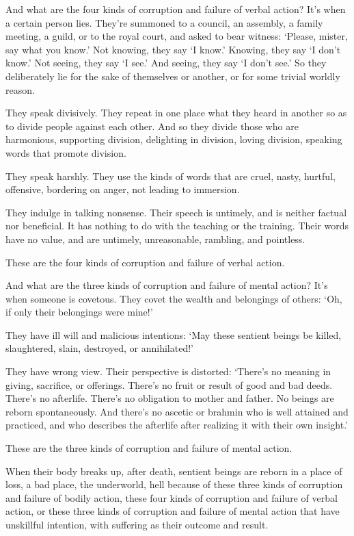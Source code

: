 \documentclass[12pt,openany]{book}%
\begin{document}
And what are the four kinds of corruption and failure of verbal action? It’s when a certain person lies. They’re summoned to a council, an assembly, a family meeting, a guild, or to the royal court, and asked to bear witness: ‘Please, mister, say what you know.’ Not knowing, they say ‘I know.’ Knowing, they say ‘I don’t know.’ Not seeing, they say ‘I see.’ And seeing, they say ‘I don’t see.’ So they deliberately lie for the sake of themselves or another, or for some trivial worldly reason. 

They speak divisively. They repeat in one place what they heard in another so as to divide people against each other. And so they divide those who are harmonious, supporting division, delighting in division, loving division, speaking words that promote division. 

They speak harshly. They use the kinds of words that are cruel, nasty, hurtful, offensive, bordering on anger, not leading to immersion. 

They indulge in talking nonsense. Their speech is untimely, and is neither factual nor beneficial. It has nothing to do with the teaching or the training. Their words have no value, and are untimely, unreasonable, rambling, and pointless. 

These are the four kinds of corruption and failure of verbal action. 

And what are the three kinds of corruption and failure of mental action? It’s when someone is covetous. They covet the wealth and belongings of others: ‘Oh, if only their belongings were mine!’ 

They have ill will and malicious intentions: ‘May these sentient beings be killed, slaughtered, slain, destroyed, or annihilated!’ 

They have wrong view. Their perspective is distorted: ‘There’s no meaning in giving, sacrifice, or offerings. There’s no fruit or result of good and bad deeds. There’s no afterlife. There’s no obligation to mother and father. No beings are reborn spontaneously. And there’s no ascetic or brahmin who is well attained and practiced, and who describes the afterlife after realizing it with their own insight.’ 

These are the three kinds of corruption and failure of mental action. 

When their body breaks up, after death, sentient beings are reborn in a place of loss, a bad place, the underworld, hell because of these three kinds of corruption and failure of bodily action, these four kinds of corruption and failure of verbal action, or these three kinds of corruption and failure of mental action that have unskillful intention, with suffering as their outcome and result. 
\end{document}
